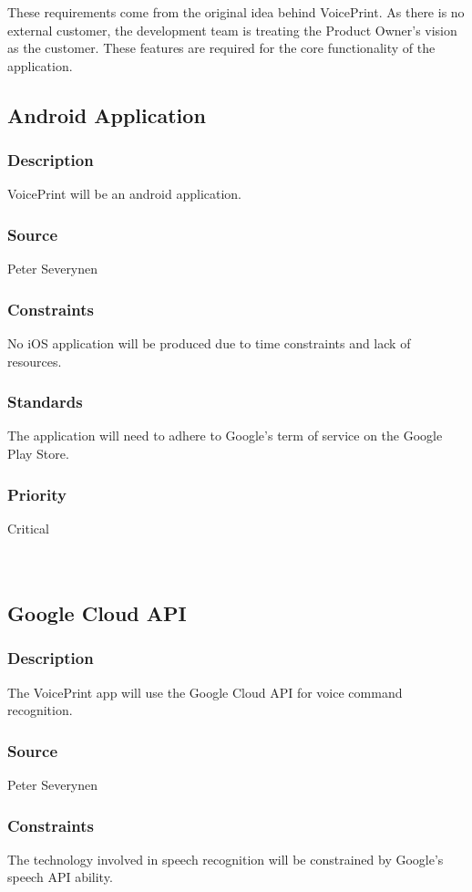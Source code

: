 These requirements come from the original idea behind VoicePrint. As there is no external customer, the development team is treating the Product Owner's vision as the customer. These features are required for the core functionality of the application.

\subsection{Android Application}
\subsubsection{Description}
VoicePrint will be an android application.
\subsubsection{Source}
Peter Severynen
\subsubsection{Constraints}
No iOS application will be produced due to time constraints and lack of resources.
\subsubsection{Standards}
The application will need to adhere to Google's term of service on the Google Play Store.\cite{play.google}
\subsubsection{Priority}
Critical\\
\\
\\
\subsection{Google Cloud API}
\subsubsection{Description}
The VoicePrint app will use the Google Cloud API for voice command recognition.
\subsubsection{Source}
Peter Severynen
\subsubsection{Constraints}
The technology involved in speech recognition will be constrained by Google's speech API ability. 
